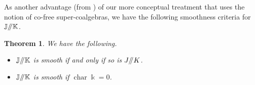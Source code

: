 \documentclass[11pt, a4paper]{amsart}
\newtheorem{theorem}{Theorem}[section]
\theoremstyle{definition}
\numberwithin{equation}{section}
\begin{document}
As another advantage (from \cite{M2}) of our more conceptual treatment 
that uses the notion of co-free super-coalgebras, 
we have the following smoothness criteria for 
$\mathbb{J}/\hspace{-1mm}/\mathbb{K}$.

\begin{theorem}\label{T42}
We have the following.
\begin{itemize}
\item[(1)]
$\mathbb{J}/\hspace{-1mm}/\mathbb{K}$ is smooth if and only if so is $J/\hspace{-1mm}/K$. 
\item[(2)]
$\mathbb{J}/\hspace{-1mm}/\mathbb{K}$ is smooth if $\operatorname{char} \Bbbk=0$.
\end{itemize}
\end{theorem}
\end{document}
